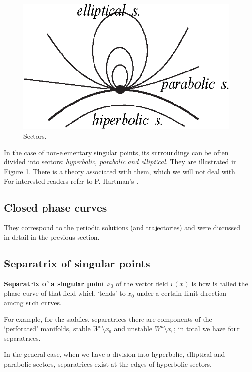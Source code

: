 \begin{figure}[!ht]
	\centering
	\includegraphics [scale=1.4]{jtr219}
	\caption{Sectors.}
	\label{fig:2.19}
\end{figure}

In the case of non-elementary singular points, its surroundings can be often divided into sectors: \textit{hyperbolic, parabolic and elliptical}. They are illustrated in Figure \ref{fig:2.19}. There is a theory associated with them, which we will not deal with. For interested readers refer to P. Hartman's \cite{Hart}.

\subsection{Closed phase curves}
They correspond to the periodic solutions (and trajectories) and were discussed in detail in the previous section.

\subsection{Separatrix of singular points}
\begin{definition}
	\textbf{Separatrix of a singular point} $x_0$ of the vector field $v (x)$ is how is called the phase curve of that field which `tends' to $x_0$ under a certain limit direction among such curves.
\end{definition}

For example, for the saddles, separatrices there are components of the `perforated' manifolds, stable $ W ^ {s} \setminus x_ {0} $ and unstable $ W ^ {u} \setminus x_ {0} $; in total we have four separatrices.

In the general case, when we have a division into hyperbolic, elliptical and parabolic sectors, separatrices exist at the edges of hyperbolic sectors.

